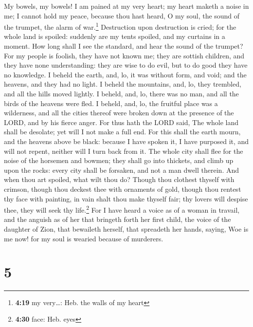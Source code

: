  My bowels, my bowels! I am pained at my very heart; my
heart maketh a noise in me; I cannot hold my peace, because thou hast
heard, O my soul, the sound of the trumpet, the alarm of war.\footnote{\textbf{4:19}
  my very\ldots: Heb. the walls of my heart}  Destruction
upon destruction is cried; for the whole land is spoiled: suddenly are
my tents spoiled, and my curtains in a moment.  How long
shall I see the standard, and hear the sound of the trumpet?
 For my people is foolish, they have not known me; they
are sottish children, and they have none understanding: they are wise to
do evil, but to do good they have no knowledge.  I beheld
the earth, and, lo, it was without form, and void; and the heavens, and
they had no light.  I beheld the mountains, and, lo, they
trembled, and all the hills moved lightly.  I beheld,
and, lo, there was no man, and all the birds of the heavens were fled.
 I beheld, and, lo, the fruitful place was a wilderness,
and all the cities thereof were broken down at the presence of the LORD,
and by his fierce anger.  For thus hath the LORD said,
The whole land shall be desolate; yet will I not make a full end.
 For this shall the earth mourn, and the heavens above be
black: because I have spoken it, I have purposed it, and will not
repent, neither will I turn back from it.  The whole city
shall flee for the noise of the horsemen and bowmen; they shall go into
thickets, and climb up upon the rocks: every city shall be forsaken, and
not a man dwell therein.  And when thou art spoiled, what
wilt thou do? Though thou clothest thyself with crimson, though thou
deckest thee with ornaments of gold, though thou rentest thy face with
painting, in vain shalt thou make thyself fair; thy lovers will despise
thee, they will seek thy life.\footnote{\textbf{4:30} face: Heb. eyes}
 For I have heard a voice as of a woman in travail, and
the anguish as of her that bringeth forth her first child, the voice of
the daughter of Zion, that bewaileth herself, that spreadeth her hands,
saying, Woe is me now! for my soul is wearied because of murderers.

\hypertarget{section-4}{%
\section{5}\label{section-4}}

